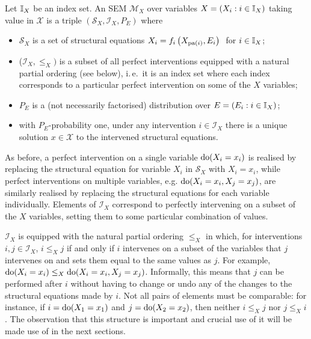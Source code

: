 \begin{definition}\label{def:causality-updated-sem}
	Let $\mathbb{I}_X$ be an index set.
	An SEM $\mathcal{M}_X$ over  variables ${X = (X_i : i\in\mathbb{I}_X )}$ taking value in $\mathcal{X}$ is a triple $\left(\mathcal{S}_X, \mathcal{I}_X, P_{E} \right)$ where
	\begin{itemize}[noitemsep]
		\item $\mathcal{S}_X$ is a set of structural equations $X_i = f_i\left( X_{\operatorname{pa}(i)} , E_i \right)\ $ for $i \in \mathbb{I}_X$;
		\item ($\mathcal{I}_X, \leq_X)$ is a subset of all perfect interventions equipped with a natural partial ordering (see below), i.\,e.\ it is an index set where each index corresponds to a particular perfect intervention on some of the $X$ variables;
		\item $P_{E}$ is a (not necessarily factorised) distribution over $E = ( E_i : i\in\mathbb{I}_X)$;
		\item with $P_E$-probability one, under any intervention ${i \in \mathcal{I}_X}$ there is a unique solution $x\in\mathcal{X}$ to the intervened structural equations. 
	\end{itemize}
\end{definition}
\medskip

As before, a perfect intervention on a single variable $\operatorname{do}(X_i=x_i)$ is realised by replacing the structural equation for variable $X_i$ in $\mathcal{S}_X$ with $X_i = x_i$,
while perfect interventions on multiple variables, e.g. $\operatorname{do}(X_i=x_i, X_j=x_j)$, are similarly realised by replacing the structural equations for each variable individually.
Elements of $\mathcal{I}_X$ correspond to perfectly intervening on a subset of the $X$ variables, setting them to some particular combination of values.

$\mathcal{I}_X$ is equipped with the natural partial ordering $\leq_X$ in which, for interventions ${i, j \in \mathcal{I}_X}$, ${i\leq_X j}$ if and only if $i$ intervenes on a subset of the variables that $j$ intervenes on and sets them equal to the same values as $j$.
For example, ${\operatorname{do}(X_i=x_i) \leq_X \operatorname{do}(X_i=x_i, X_j=x_j)}$.
Informally, this means that $j$ can be performed after $i$ without having to change or undo any of the changes to the structural equations made by $i$.
Not all pairs of elements must be comparable: for instance, if $i= \operatorname{do}(X_1=x_1)$ and $j = \operatorname{do}(X_2=x_2)$, then neither $i\leq_X j$ nor $j \leq_X i$. 
The observation that this structure is important and crucial use of it will be made use of in the next sections.

